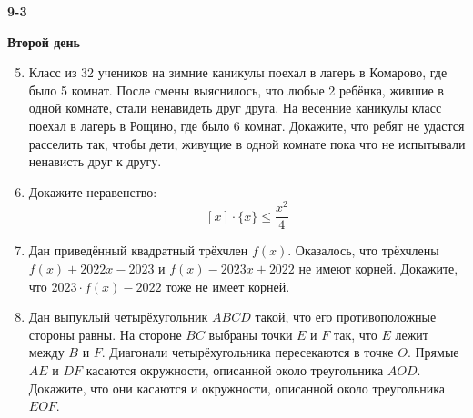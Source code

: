 \documentclass{article}
\begin{document}
    \large

    \begin{center}
        \LARGE\textbf{9-3}
    \end{center}
    \begin{center}
        \large\textbf{Второй день}
    \end{center}


    \begin{enumerate}[label*=9.{\arabic{enumi}}]
        \setcounter{enumi}{4}
        \item Класс из 32 учеников на зимние каникулы поехал в лагерь в Комарово, где было 5 комнат.
        После смены выяснилось, что любые 2 ребёнка, жившие в одной комнате, стали ненавидеть друг друга.
        На весенние каникулы класс поехал в лагерь в Рощино, где было 6 комнат.
        Докажите, что ребят не удастся расселить так, чтобы дети, живущие в одной комнате пока что не испытывали ненависть друг к другу.

        \item Докажите неравенство: \[[x]\cdot\{x\} \leqslant \frac{x^2}{4}\]

        \item Дан приведённый квадратный трёхчлен $f(x)$.
        Оказалось, что трёхчлены $f(x) + 2022x - 2023$ и  $f(x) - 2023x + 2022$ не имеют корней.
        Докажите, что $2023\cdot f(x) - 2022$ тоже не имеет корней.

        \item Дан выпуклый четырёхугольник $ABCD$ такой, что его противоположные стороны равны.
        На стороне $BC$ выбраны точки $E$ и $F$ так, что $E$ лежит между $B$ и $F$.
        Диагонали четырёхугольника пересекаются в точке $O$.
        Прямые $AE$ и $DF$ касаются окружности, описанной около треугольника $AOD$.
        Докажите, что они касаются и окружности, описанной около треугольника $EOF$.

    \end{enumerate}
\end{document}
